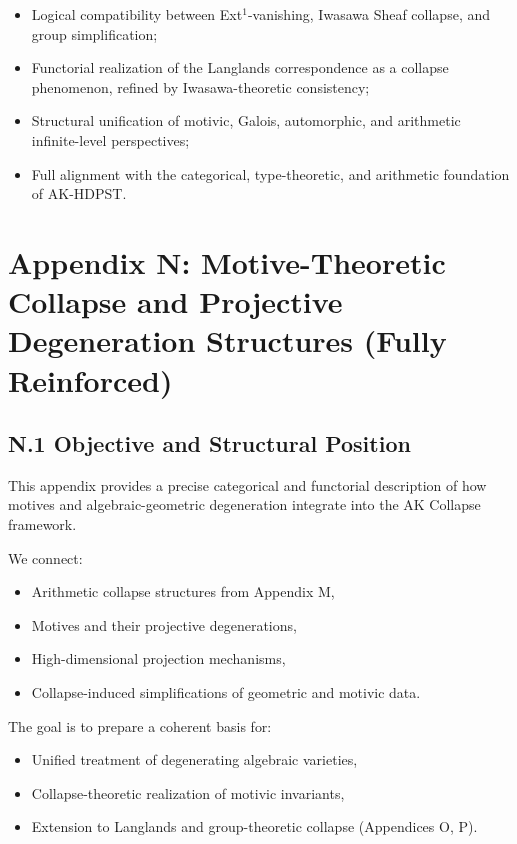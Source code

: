 \documentclass[11pt]{article}
\begin{document}
\begin{itemize}
    \item Logical compatibility between Ext$^1$-vanishing, Iwasawa Sheaf collapse, and group simplification;
    \item Functorial realization of the Langlands correspondence as a collapse phenomenon, refined by Iwasawa-theoretic consistency;
    \item Structural unification of motivic, Galois, automorphic, and arithmetic infinite-level perspectives;
    \item Full alignment with the categorical, type-theoretic, and arithmetic foundation of AK-HDPST.
\end{itemize}




\section*{Appendix N: Motive-Theoretic Collapse and Projective Degeneration Structures (Fully Reinforced)}

\subsection*{N.1 Objective and Structural Position}

This appendix provides a precise categorical and functorial description of how motives and algebraic-geometric degeneration integrate into the AK Collapse framework.  

We connect:
\begin{itemize}
  \item Arithmetic collapse structures from Appendix M,
  \item Motives and their projective degenerations,
  \item High-dimensional projection mechanisms,
  \item Collapse-induced simplifications of geometric and motivic data.
\end{itemize}

The goal is to prepare a coherent basis for:
\begin{itemize}
  \item Unified treatment of degenerating algebraic varieties,
  \item Collapse-theoretic realization of motivic invariants,
  \item Extension to Langlands and group-theoretic collapse (Appendices O, P).
\end{itemize}
\end{document}
